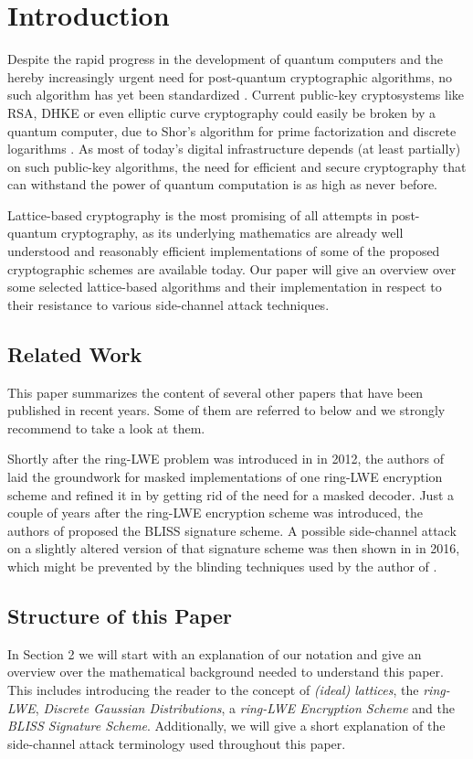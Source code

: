 \chapter{Introduction}
Despite the rapid progress in the development of quantum computers and the hereby increasingly urgent need for post-quantum cryptographic algorithms, no such algorithm has yet been standardized \cite{Nist}. Current public-key cryptosystems like \acs{RSA}, \acs{DHKE} or even elliptic curve cryptography could easily be broken by a quantum computer, due to Shor's algorithm for prime factorization and discrete logarithms \cite{Shor}. As most of today's digital infrastructure depends (at least partially) on such public-key algorithms, the need for efficient and secure cryptography that can withstand the power of quantum computation is as high as never before.

Lattice-based cryptography is the most promising of all attempts in post-quantum cryptography, as its underlying mathematics are already well understood and reasonably efficient implementations of some of the proposed cryptographic schemes are available today. Our paper will give an overview over some selected lattice-based algorithms and their implementation in respect to their resistance to various side-channel attack techniques.

\section{Related Work}
This paper summarizes the content of several other papers that have been published in recent years. Some of them are referred to below and we strongly recommend to take a look at them.

Shortly after the \acs{ring-LWE} problem was introduced in \cite{cryptoeprint:2012:230} in 2012, the authors of \cite{maskedRing} laid the groundwork for masked implementations of one \acs{ring-LWE} encryption scheme and refined it in \cite{Reparaz2016} by getting rid of the need for a masked decoder. Just a couple of years after the \acs{ring-LWE} encryption scheme was introduced, the authors of \cite{bliss} proposed the BLISS signature scheme. A possible side-channel attack on a slightly altered version of that signature scheme was then shown in \cite{cryptoeprint:2016:300} in 2016, which might be prevented by the blinding techniques used by the author of \cite{cryptoeprint:2016:276}.

\section{Structure of this Paper}
In Section 2 we will start with an explanation of our notation and give an overview over the mathematical background needed to understand this paper. This includes introducing the reader to the concept of \textit{(ideal) lattices}, the \textit{\ac{ring-LWE}}, \textit{Discrete Gaussian Distributions}, a \textit{\ac{ring-LWE} Encryption Scheme} and the \textit{BLISS Signature Scheme}. Additionally, we will give a short explanation of the side-channel attack terminology used throughout this paper.

